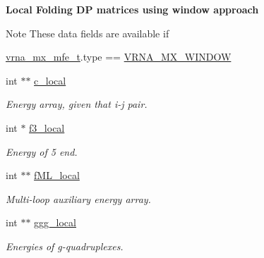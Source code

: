 \begin{Indent}{\bf Local Folding D\+P matrices using window approach}\par
{\em \begin{DoxyNote}{Note}
These data fields are available if 
\begin{DoxyCode}
\hyperlink{group__dp__matrices_structvrna__mx__mfe__s}{vrna\_mx\_mfe\_t}.type == \hyperlink{group__dp__matrices_gga6042ea1d58d01931e959791be6d89343a2ea5d5947f6ec02544934b0ff2785e99}{VRNA\_MX\_WINDOW} 
\end{DoxyCode}
 
\end{DoxyNote}
}\begin{DoxyCompactItemize}
\item 
\hypertarget{group__dp__matrices_a116c677ece0832e6ab9cc2fd1ebfe452}{}int $\ast$$\ast$ \hyperlink{group__dp__matrices_a116c677ece0832e6ab9cc2fd1ebfe452}{c\+\_\+local}\label{group__dp__matrices_a116c677ece0832e6ab9cc2fd1ebfe452}

\begin{DoxyCompactList}\small\item\em Energy array, given that i-\/j pair. \end{DoxyCompactList}\item 
\hypertarget{group__dp__matrices_a6eae0a2b696b0c63bbaa78a70b950600}{}int $\ast$ \hyperlink{group__dp__matrices_a6eae0a2b696b0c63bbaa78a70b950600}{f3\+\_\+local}\label{group__dp__matrices_a6eae0a2b696b0c63bbaa78a70b950600}

\begin{DoxyCompactList}\small\item\em Energy of 5\textquotesingle{} end. \end{DoxyCompactList}\item 
\hypertarget{group__dp__matrices_ad37d705240a8e6b1e9a4e4ea19e74003}{}int $\ast$$\ast$ \hyperlink{group__dp__matrices_ad37d705240a8e6b1e9a4e4ea19e74003}{f\+M\+L\+\_\+local}\label{group__dp__matrices_ad37d705240a8e6b1e9a4e4ea19e74003}

\begin{DoxyCompactList}\small\item\em Multi-\/loop auxiliary energy array. \end{DoxyCompactList}\item 
\hypertarget{group__dp__matrices_afd3ea65bc8f06559f7f1ea79072fa385}{}int $\ast$$\ast$ \hyperlink{group__dp__matrices_afd3ea65bc8f06559f7f1ea79072fa385}{ggg\+\_\+local}\label{group__dp__matrices_afd3ea65bc8f06559f7f1ea79072fa385}

\begin{DoxyCompactList}\small\item\em Energies of g-\/quadruplexes. \end{DoxyCompactList}\end{DoxyCompactItemize}
\end{Indent}
